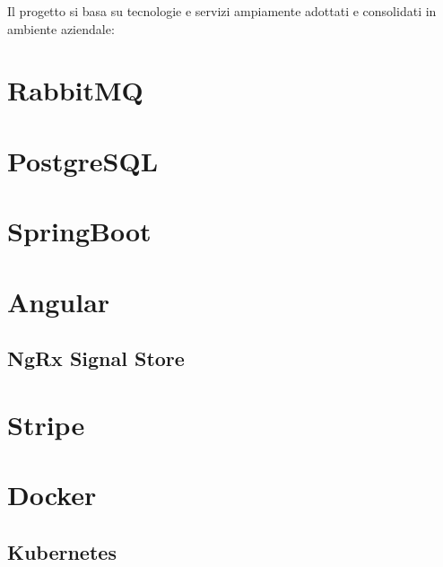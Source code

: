 Il progetto si basa su tecnologie e servizi ampiamente adottati e consolidati in ambiente aziendale:

\section{RabbitMQ}

\section{PostgreSQL}

\section{SpringBoot}

\section{Angular}

\subsection {NgRx Signal Store}

\section{Stripe}

\section{Docker}

\subsection{Kubernetes}
